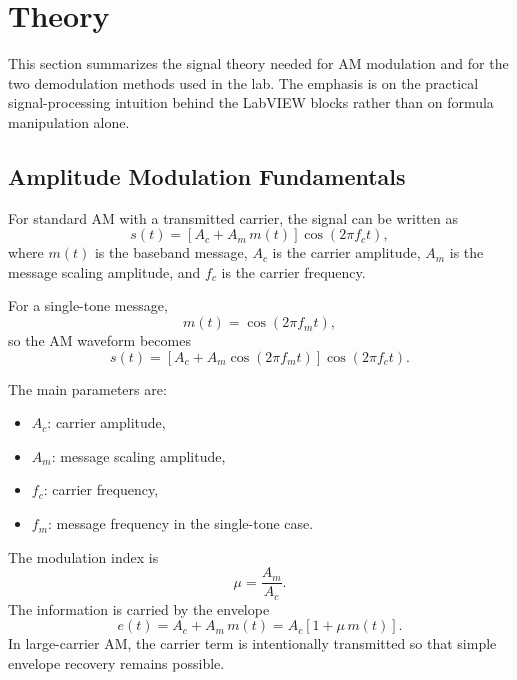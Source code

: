 \section{Theory}
\label{sec:lab2_theory}

This section summarizes the signal theory needed for AM modulation and for the
two demodulation methods used in the lab. The emphasis is on the practical
signal-processing intuition behind the LabVIEW blocks rather than on formula
manipulation alone.

\subsection{Amplitude Modulation Fundamentals}

For standard AM with a transmitted carrier, the signal can be written as
\begin{equation}
s(t)=\left[A_c + A_m\,m(t)\right]\cos(2\pi f_c t),
\label{eq:lab2_am_general}
\end{equation}
where $m(t)$ is the baseband message, $A_c$ is the carrier amplitude, $A_m$ is
the message scaling amplitude, and $f_c$ is the carrier frequency.

For a single-tone message,
\begin{equation}
m(t)=\cos(2\pi f_m t),
\label{eq:lab2_single_tone}
\end{equation}
so the AM waveform becomes
\begin{equation}
s(t)=\left[A_c + A_m\cos(2\pi f_m t)\right]\cos(2\pi f_c t).
\label{eq:lab2_am_single_tone}
\end{equation}

The main parameters are:
\begin{itemize}
\item $A_c$: carrier amplitude,
\item $A_m$: message scaling amplitude,
\item $f_c$: carrier frequency,
\item $f_m$: message frequency in the single-tone case.
\end{itemize}

The modulation index is
\begin{equation}
\mu=\frac{A_m}{A_c}.
\label{eq:lab2_mu}
\end{equation}
The information is carried by the envelope
\begin{equation}
e(t)=A_c + A_m\,m(t)=A_c\left[1+\mu\,m(t)\right].
\end{equation}
In large-carrier AM, the carrier term is intentionally transmitted so that
simple envelope recovery remains possible.

